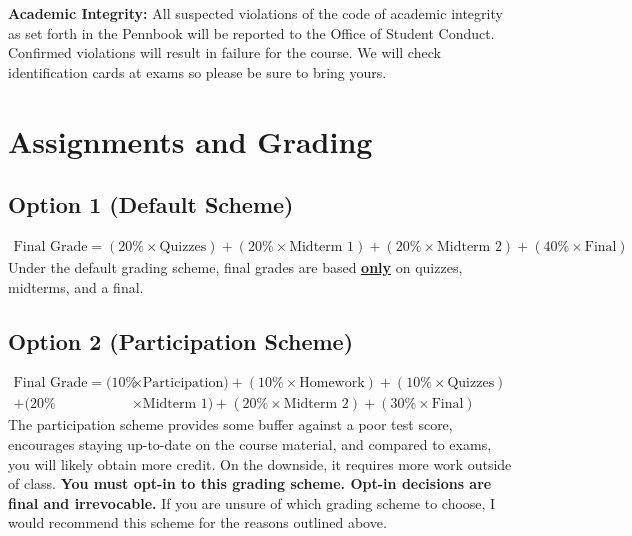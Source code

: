 \documentclass[11pt, letterpaper]{article}
\begin{document}
\bigskip

\noindent \textbf{Academic Integrity: } 
All suspected violations of the code of academic integrity as set forth in the Pennbook will be reported to the Office of Student Conduct. 
Confirmed violations will result in failure for the course. 
We will check identification cards at exams so please be sure to bring yours.

\medskip

\section*{Assignments and Grading}
\textbf{}
	\subsection*{Option 1 (Default Scheme)}
		\begin{align*}
		\text{Final Grade} = (20\% \times \text{Quizzes}) + (20\% \times \text{Midterm 1}) + 
		(20\% \times \text{Midterm 2}) + (40\% \times \text{Final})
		\end{align*}
	Under the default grading scheme, final grades are based \textbf{\underline{only}} on quizzes, midterms, and a final.

	\subsection*{Option 2 (Participation Scheme)}
		\begin{align*}
		\text{Final Grade} = (10\% &\times \text{Participation}) + (10\% \times \text{Homework}) + (10\% \times \text{Quizzes}) 
		\\
		+ (20\% &\times \text{Midterm 1}) + (20\% \times \text{Midterm 2}) + (30\% \times \text{Final})
		\end{align*}
	The participation scheme provides some buffer against a poor test score, encourages staying up-to-date on the course material, and compared to exams, you will likely obtain more credit. 
	On the downside, it requires more work outside of class. 
	\textbf{You must opt-in to this grading scheme. Opt-in decisions are final and irrevocable.} 
	If you are unsure of which grading scheme to choose, I would recommend this scheme for the reasons outlined above.

\medskip
\end{document}
